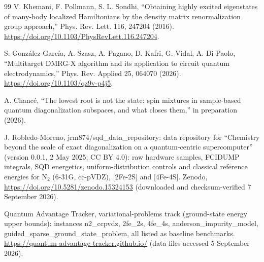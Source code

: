 \documentclass[11pt]{article}
\begin{document}
\begin{thebibliography}{99}
V. Khemani, F. Pollmann, S. L. Sondhi, ``Obtaining highly excited eigenstates of many-body localized Hamiltonians by the density matrix renormalization group approach,'' Phys. Rev. Lett. 116, 247204 (2016). \url{https://doi.org/10.1103/PhysRevLett.116.247204}.

S. Gonz\'alez-Garc\'ia, A. Szasz, A. Pagano, D. Kafri, G. Vidal, A. Di Paolo, ``Multitarget DMRG-X algorithm and its application to circuit quantum electrodynamics,'' Phys. Rev. Applied 25, 064070 (2026). \url{https://doi.org/10.1103/qz9v-p4j5}.

A. Chanc\'e, ``The lowest root is not the state: spin mixtures in sample-based quantum diagonalization subspaces, and what closes them,'' in preparation (2026).

J. Robledo-Moreno, jrm874/sqd\_data\_repository: data repository for ``Chemistry beyond the scale of exact diagonalization on a quantum-centric supercomputer'' (version 0.0.1, 2 May 2025; CC BY 4.0): raw hardware samples, FCIDUMP integrals, SQD energetics, uniform-distribution controls and classical reference energies for N$_2$ (6-31G, cc-pVDZ), [2Fe-2S] and [4Fe-4S]. Zenodo, \url{https://doi.org/10.5281/zenodo.15324153} (downloaded and checksum-verified 7 September 2026).

Quantum Advantage Tracker, variational-problems track (ground-state energy upper bounds): instances n2\_ccpvdz, 2fe\_2s, 4fe\_4s, anderson\_impurity\_model, guided\_sparse\_ground\_state\_problem, all listed as baseline benchmarks. \url{https://quantum-advantage-tracker.github.io/} (data files accessed 5 September 2026).

\end{thebibliography}\endgroup
\end{document}
